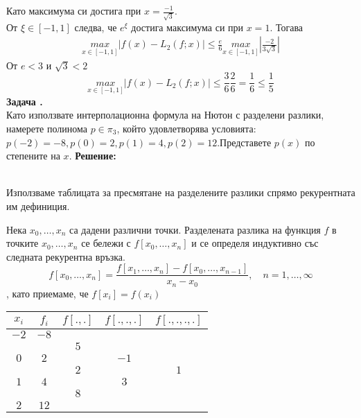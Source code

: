 \documentclass[12pt]{article}
\newcounter{problem}
\newcounter{solution}
\newcommand\problem{%
  \stepcounter{problem}%
  \textbf{Задача \theproblem.}~%
  \\
}
\newcommand\solution{%
  \textbf{Решение:}\\~%
}
\begin{document}

Като максимума си достига при $x=\frac{-1}{\sqrt3}$.\\
От $\xi\in[-1,1]$ следва, че $e^\xi$ достига максимума си при $x=1$.
Тогава
\begin{align*}
\underset{x\in[-1,1]}{max}|f(x)-L_2(f;x)| \leq \frac{e}{6}\underset{x\in[-1,1]}{max}\left |\frac{-2}{3\sqrt3}\right|
\end{align*}
От $e < 3$ и $\sqrt3 < 2$
\begin{equation*}
\underset{x\in[-1,1]}{max}|f(x)-L_2(f;x)| \leq\frac{3}{6}\frac{2}{6}=\frac{1}{6} \leq \frac{1}{5} 
\end{equation*}
\problem
Като използвате интерполационна формула на Нютон с разделени разлики, намерете полинома $p\in\pi_3$, който удовлетворява условията: $p(-2) = -8, p(0) = 2, p(1)=4, p(2) = 12$.Представете $p(x)$ по степените на $x$.
\solution
Използваме таблицата за пресмятане на разделените разлики спрямо рекурентната им дефиниция.\\
\begin{tcolorbox}[colback=red!5!white,colframe=red!75!black]
    Нека $x_0, \dotso, x_n$ са дадени различни точки. Разделената разлика на функция $f$ в точките $x_0, \dotso, x_n$ се бележи с $f[x_0, \dotso, x_n]$ и се определя индуктивно със следната рекурентна връзка.
    \begin{equation*}
      f[x_0, \dotso, x_n] = \frac{f[x_1, \dotso, x_n] - f[x_0, \dotso, x_{n-1}]}{x_n - x_0},\hspace{12pt}n = 1, \dotso, \infty
    \end{equation*}
    , като приемаме, че $f[x_i] = f(x_i)$
\end{tcolorbox}
\begin{tabular}{|c c c c c|}
\hline
$x_i$&$f_i$&$f[.,.]$&$f[.,.,.]$&$f[.,.,.,.]$\\
\hline
$-2$ & $-8$ &     &      &\\
     &      & $5$ &      &\\
$0$  & $2$  &     & $-1$ &\\
     &      & $2$ &      &$1$\\
$1$  & $4$  &     & $3$  &\\
     &      & $8$ &      &\\
$2$  & $12$ &     &      &\\
\hline
\end{tabular}\\
\end{document}

